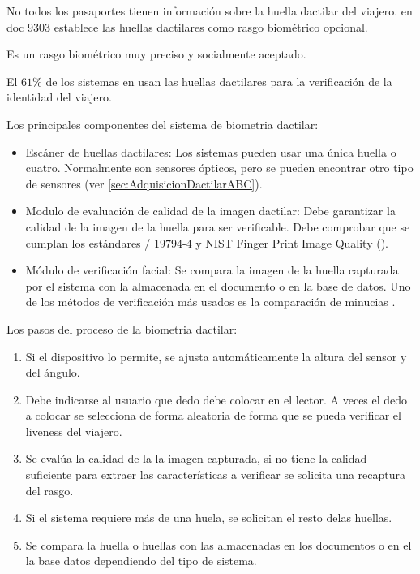 \color{red}
No todos los pasaportes tienen  información sobre la huella dactilar del viajero.  en doc $9303$ \cite{doc20069303} establece las huellas dactilares como rasgo biométrico opcional.

Es un rasgo biométrico muy preciso y socialmente aceptado.

El $61$\% de los sistemas  en  usan las huellas dactilares para la verificación de la identidad del viajero.

Los principales componentes del sistema de \gls{biometria} \gls{dactilar}:

\begin{itemize}
    \item 
    Escáner de huellas dactilares: Los sistemas  pueden usar una única huella o cuatro. Normalmente son sensores ópticos, pero se pueden encontrar otro tipo de sensores (ver \ref{sec:AdquisicionDactilarABC}).  
    \item
    Modulo de evaluación de calidad de la imagen dactilar: Debe garantizar la calidad de la imagen de la huella para ser verificable. Debe comprobar que se cumplan los estándares / $19794$-$4$ \cite{ISO/Finger} y NIST Finger Print Image Quality ().
    \item
    Módulo de verificación facial: Se compara la imagen de la huella capturada por el sistema con la almacenada en el documento o en la base de datos. Uno de los métodos de verificación más usados es la comparación de minucias \cite{gamassi2005fingerprint}\cite{gamassi2005robust}\cite{maltoni2009handbook}. 
\end{itemize}

Los pasos del proceso de la \gls{biometria} \gls{dactilar}:

\begin{enumerate}
    \item
    Si el dispositivo lo permite, se ajusta automáticamente la altura del sensor y del ángulo.
    
    \item
    Debe indicarse al usuario que dedo debe colocar en el lector. A veces el dedo a colocar se selecciona de forma aleatoria de forma que se pueda verificar el \gls{liveness} del viajero.
    
    \item
    Se evalúa la calidad de la la imagen capturada, si no tiene la calidad suficiente para extraer las características a verificar se solicita una recaptura del rasgo.
    
    \item
    Si el sistema requiere más de una huela, se solicitan el resto delas huellas.
    
    \item
    Se compara la huella o huellas con las almacenadas en los documentos o en el la base datos dependiendo del tipo de sistema. 
    
\end{enumerate}

